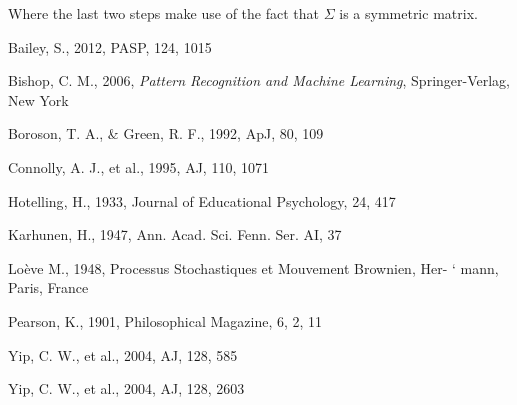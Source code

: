 \documentclass[12pt,preprint]{aastex}
\begin{document}
Where the last two steps make use of the fact that $\Sigma$ is a
symmetric matrix.


\clearpage

\begin{thebibliography}{}\raggedright

{Bailey}, S., 2012, PASP, 124, 1015

{Bishop}, C. M., 2006, \textit{Pattern Recognition and Machine
  Learning}, Springer-Verlag, New York

{Boroson}, T. A., \& Green, R. F., 1992, ApJ, 80, 109

{Connolly}, A. J., et al., 1995, AJ, 110, 1071 

{Hotelling}, H., 1933, Journal of Educational Psychology, 24, 417

{Karhunen}, H., 1947, Ann. Acad. Sci. Fenn. Ser. AI, 37

{Lo\`{e}ve} M., 1948, Processus Stochastiques et Mouvement Brownien, Her- `
mann, Paris, France

{Pearson}, K., 1901, Philosophical Magazine, 6, 2, 11

{Yip}, C. W., et al., 2004, AJ, 128, 585

{Yip}, C. W., et al., 2004, AJ, 128, 2603




\end{thebibliography}

\clearpage
\end{document}
